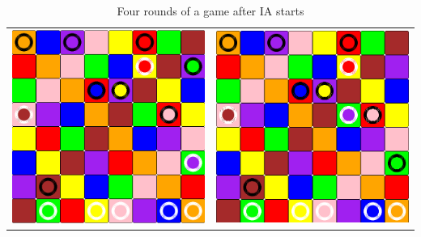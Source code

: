 \documentclass[a4paper, 11pt]{beamer}
\begin{document}
\begin{frame}
\begin{table}[htbp]
\begin{tabular}{c c}
    \includegraphics[scale = 0.11]{mathieu3_3.png} & \includegraphics[scale = 0.11]{mathieu3_4.png} \\
  \end{tabular}
  \caption{Four rounds of a game after IA starts}
 \end{table}
 
\end{frame}
\end{document}
